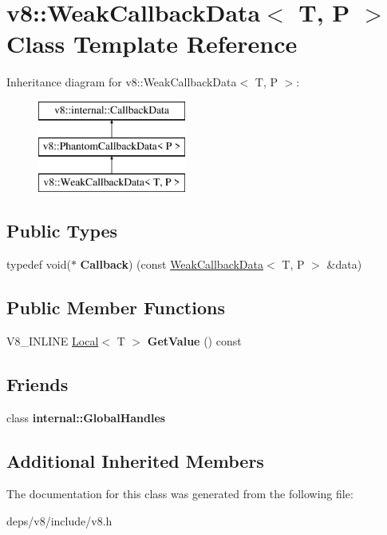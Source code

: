 \hypertarget{classv8_1_1_weak_callback_data}{}\section{v8\+:\+:Weak\+Callback\+Data$<$ T, P $>$ Class Template Reference}
\label{classv8_1_1_weak_callback_data}
Inheritance diagram for v8\+:\+:Weak\+Callback\+Data$<$ T, P $>$\+:\begin{figure}[H]
\begin{center}
\leavevmode
\includegraphics[height=3.000000cm]{classv8_1_1_weak_callback_data}
\end{center}
\end{figure}
\subsection*{Public Types}
\begin{DoxyCompactItemize}
\item 
\hypertarget{classv8_1_1_weak_callback_data_a08a29122f54c663fc2442d8f42c08ac2}{}typedef void($\ast$ {\bfseries Callback}) (const \hyperlink{classv8_1_1_weak_callback_data}{Weak\+Callback\+Data}$<$ T, P $>$ \&data)\label{classv8_1_1_weak_callback_data_a08a29122f54c663fc2442d8f42c08ac2}

\end{DoxyCompactItemize}
\subsection*{Public Member Functions}
\begin{DoxyCompactItemize}
\item 
\hypertarget{classv8_1_1_weak_callback_data_a0e8fcf0091132c96d548ac319284710a}{}V8\+\_\+\+I\+N\+L\+I\+N\+E \hyperlink{classv8_1_1_local}{Local}$<$ T $>$ {\bfseries Get\+Value} () const \label{classv8_1_1_weak_callback_data_a0e8fcf0091132c96d548ac319284710a}

\end{DoxyCompactItemize}
\subsection*{Friends}
\begin{DoxyCompactItemize}
\item 
\hypertarget{classv8_1_1_weak_callback_data_af107d8c7663669a5fd39ab41cf5ead03}{}class {\bfseries internal\+::\+Global\+Handles}\label{classv8_1_1_weak_callback_data_af107d8c7663669a5fd39ab41cf5ead03}

\end{DoxyCompactItemize}
\subsection*{Additional Inherited Members}


The documentation for this class was generated from the following file\+:\begin{DoxyCompactItemize}
\item 
deps/v8/include/v8.\+h\end{DoxyCompactItemize}
